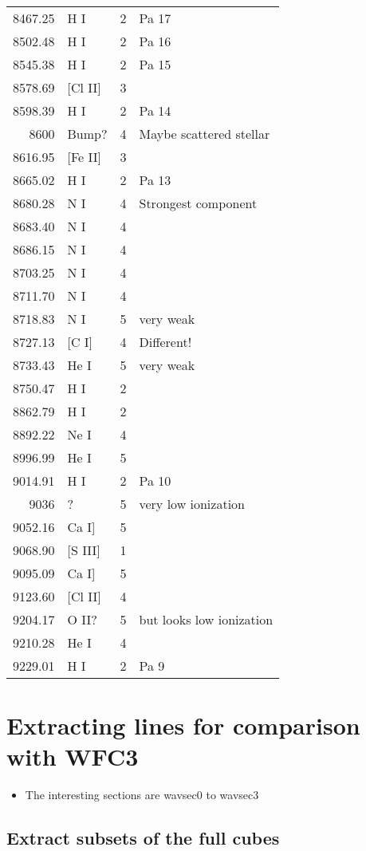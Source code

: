 \documentclass[11pt]{article}
\begin{document}
\begin{center}
\begin{tabular}{rlrl}
8467.25 & H I & 2 & Pa 17\\
8502.48 & H I & 2 & Pa 16\\
8545.38 & H I & 2 & Pa 15\\
8578.69 & [Cl II] & 3 & \\
8598.39 & H I & 2 & Pa 14\\
8600 & Bump? & 4 & Maybe scattered stellar\\
8616.95 & [Fe II] & 3 & \\
8665.02 & H I & 2 & Pa 13\\
8680.28 & N I & 4 & Strongest component\\
8683.40 & N I & 4 & \\
8686.15 & N I & 4 & \\
8703.25 & N I & 4 & \\
8711.70 & N I & 4 & \\
8718.83 & N I & 5 & very weak\\
8727.13 & [C I] & 4 & Different!\\
8733.43 & He I & 5 & very weak\\
8750.47 & H I & 2 & \\
\hline
8862.79 & H I & 2 & \\
8892.22 & Ne I & 4 & \\
8996.99 & He I & 5 & \\
9014.91 & H I & 2 & Pa 10\\
9036 & ? & 5 & very low ionization\\
9052.16 & Ca I] & 5 & \\
9068.90 & [S III] & 1 & \\
9095.09 & Ca I] & 5 & \\
9123.60 & [Cl II] & 4 & \\
9204.17 & O II? & 5 & but looks low ionization\\
9210.28 & He I & 4 & \\
9229.01 & H I & 2 & Pa 9\\
\end{tabular}
\end{center}
\section{Extracting lines for comparison with WFC3}
\label{sec:orgheadline45}
\begin{itemize}
\item The interesting sections are wavsec0 to wavsec3
\end{itemize}

\subsection{Extract subsets of the full cubes}
\label{sec:orgheadline33}
\end{document}
